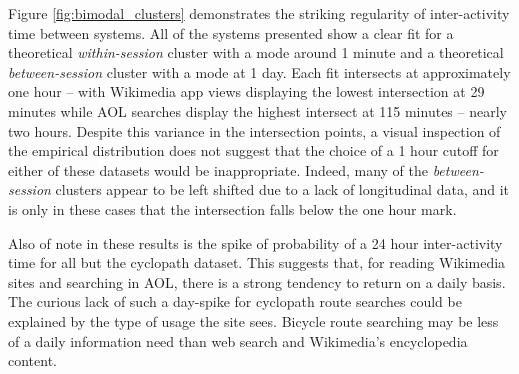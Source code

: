 Figure \ref{fig:bimodal_clusters} demonstrates the striking regularity of inter-activity time between systems.  All of the systems presented show a clear fit for a theoretical \emph{within-session} cluster with a mode around 1 minute and a theoretical \emph{between-session} cluster with a mode at 1 day.  Each fit intersects at approximately one hour -- with Wikimedia app views displaying the lowest intersection at 29 minutes while AOL searches display the highest intersect at 115 minutes -- nearly two hours.   Despite this variance in the intersection points, a visual inspection of the empirical distribution does not suggest that the choice of a 1 hour cutoff for either of these datasets would be inappropriate.  Indeed, many of the \emph{between-session} clusters appear to be left shifted due to a lack of longitudinal data, and it is only in these cases that the intersection falls below the one hour mark.

Also of note in these results is the spike of probability of a 24 hour inter-activity time for all but the cyclopath dataset.  This suggests that, for reading Wikimedia sites and searching in AOL, there is a strong tendency to return on a daily basis.  The curious lack of such a day-spike for cyclopath route searches could be explained by the type of usage the site sees. Bicycle route searching may be less of a daily information need than web search and Wikimedia's encyclopedia content.

